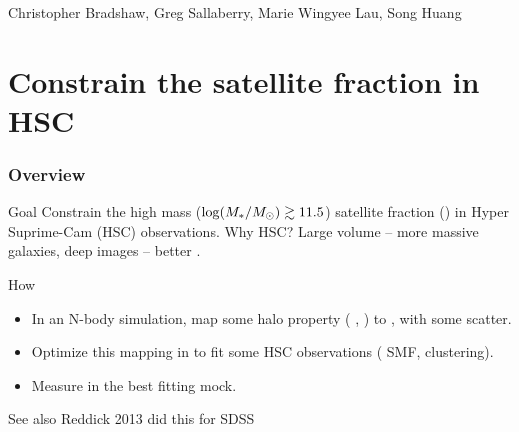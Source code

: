 \documentclass[t]{beamer}
\begin{document}
\begin{frame}
    \frametitle{}
    \tableofcontents
    Christopher Bradshaw, Greg Sallaberry, Marie Wingyee Lau, Song Huang
\end{frame}


\section{Constrain the satellite fraction in HSC}
\begin{frame}
    \frametitle{Overview}
    \begin{block}{Goal}
        Constrain the high mass (${\rm log}{}(M_{\ast}{} / \mbox{$M_{\odot}$}{}){} \gtrsim{} 11.5$) satellite fraction (\fsat{}) in Hyper Suprime-Cam (HSC) observations. Why HSC? Large volume -- more massive galaxies, deep images -- better \Mstar{}.
    \end{block}

    \begin{block}{How}
        \begin{itemize}
            \item In an N-body simulation, map some halo property (\eg{} \MhaloPeak{}, \vmp{}) to \Mstar{}, with some scatter.
            \item Optimize this mapping in to fit some HSC observations (\eg{} SMF, clustering).
            \item Measure \fsat{} in the best fitting mock.
        \end{itemize}
    \end{block}

    \begin{block}{See also}
        Reddick 2013 did this for SDSS
    \end{block}
\end{frame}
\end{document}
